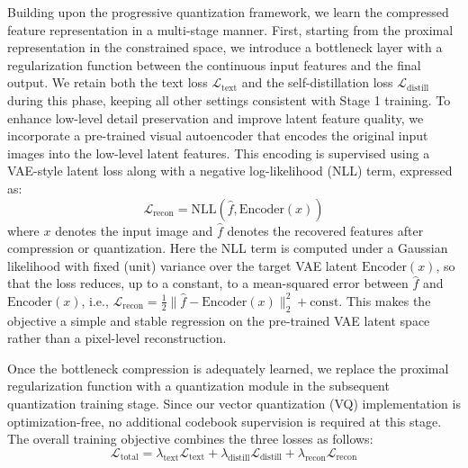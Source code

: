 Building upon the progressive quantization framework, we learn the compressed feature representation in a multi-stage manner. First, starting from the proximal representation in the constrained space, we introduce a bottleneck layer with a regularization function between the continuous input features and the final output. We retain both the text loss \(\mathcal{L}_{\text{text}}\) and the self-distillation loss \(\mathcal{L}_{\text{distill}}\) during this phase, keeping all other settings consistent with Stage 1 training. To enhance low-level detail preservation and improve latent feature quality, we incorporate a pre-trained visual autoencoder that encodes the original input images into the low-level latent features. This encoding is supervised using a VAE-style latent loss along with a negative log-likelihood (NLL) term, expressed as:
\begin{equation}
\mathcal{L}_{\text{recon}} = \text{NLL}(\hat{f}, \text{Encoder}(x))
\end{equation}
where \(x\) denotes the input image and $\hat{f}$ denotes the recovered features after compression or quantization. Here the NLL term is computed under a Gaussian likelihood with fixed (unit) variance over the target VAE latent $\text{Encoder}(x)$, so that the loss reduces, up to a constant, to a mean-squared error between $\hat{f}$ and $\text{Encoder}(x)$, i.e., $\mathcal{L}_{\text{recon}} = \tfrac{1}{2}\lVert \hat{f} - \text{Encoder}(x)\rVert_2^2 + \text{const}$. This makes the objective a simple and stable regression on the pre-trained VAE latent space rather than a pixel-level reconstruction.

Once the bottleneck compression is adequately learned, we replace the proximal regularization function with a quantization module in the subsequent quantization training stage. Since our vector quantization (VQ) implementation is optimization-free, no additional codebook supervision is required at this stage. The overall training objective combines the three losses as follows:
\begin{equation}
\mathcal{L}_{\text{total}} = \lambda_{\text{text}}\mathcal{L}_{\text{text}} + \lambda_{\text{distill}}\mathcal{L}_{\text{distill}} + \lambda_{\text{recon}}\mathcal{L}_{\text{recon}}
\end{equation}
